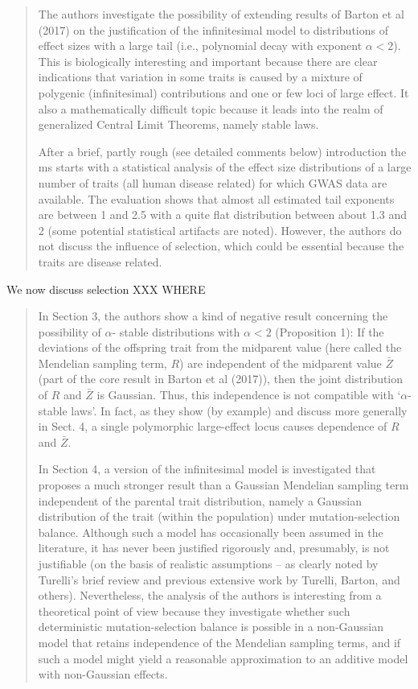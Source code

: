\reply{
}


\begin{quote}
The authors investigate the possibility of extending results of Barton et al (2017) on the
justification of the infinitesimal model to distributions of effect sizes with a large tail (i.e.,
polynomial decay with exponent $\alpha < 2$). This is biologically interesting and important
because there are clear indications that variation in some traits is caused by a mixture
of polygenic (infinitesimal) contributions and one or few loci of large effect. It also a
mathematically difficult topic because it leads into the realm of generalized Central Limit
Theorems, namely stable laws.

After a brief, partly rough (see detailed comments below) introduction the ms starts with
a statistical analysis of the effect size distributions of a large number of traits (all human
disease related) for which GWAS data are available. The evaluation shows that almost
all estimated tail exponents are between 1 and 2.5 with a quite flat distribution between
about 1.3 and 2 (some potential statistical artifacts are noted). However, the authors do
not discuss the influence of selection, which could be essential because the traits are disease
related.
\end{quote}

We now discuss selection XXX WHERE

\begin{quote}
In Section 3, the authors show a kind of negative result concerning the possibility of $\alpha$-
stable distributions with $\alpha < 2$ (Proposition 1): If the deviations of the offspring trait
from the midparent value (here called the Mendelian sampling term, $R$) are independent
of the midparent value $\bar Z$ (part of the core result in Barton et al (2017)), then the joint
distribution of $R$ and $\bar Z$ is Gaussian. Thus, this independence is not compatible with ‘$\alpha$-
stable laws’. In fact, as they show (by example) and discuss more generally in Sect. 4, a
single polymorphic large-effect locus causes dependence of $R$ and $\bar Z$.

In Section 4, a version of the infinitesimal model is investigated that proposes a much
stronger result than a Gaussian Mendelian sampling term independent of the parental
trait distribution, namely a Gaussian distribution of the trait (within the population)
under mutation-selection balance. Although such a model has occasionally been assumed
in the literature, it has never been justified rigorously and, presumably, is not justifiable
(on the basis of realistic assumptions – as clearly noted by Turelli’s brief review and
previous extensive work by Turelli, Barton, and others). Nevertheless, the analysis of the
authors is interesting from a theoretical point of view because they investigate whether
such deterministic mutation-selection balance is possible in a non-Gaussian model that
retains independence of the Mendelian sampling terms, and if such a model might yield a
reasonable approximation to an additive model with non-Gaussian effects.
\end{quote}

